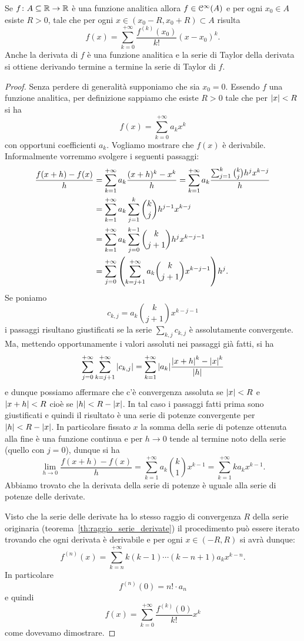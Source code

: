 \begin{theorem}
\label{th:48765}%
Se $f\colon A\subseteq \mathbb R\to\mathbb R$ è una funzione analitica allora
$f\in \mathcal C^\infty(A)$ e per ogni $x_0\in A$ esiste $R>0$, tale che
per ogni $x \in (x_0-R, x_0+R)\subset A$ risulta
\begin{equation}\label{eq:2344494}
  f(x) = \sum_{k=0}^{+\infty} \frac{f^{(k)}(x_0)}{k!}(x-x_0)^k.
\end{equation}
Anche la derivata di $f$ è una funzione analitica e la serie
di Taylor della derivata si ottiene derivando termine a termine
la serie di Taylor di $f$.
\end{theorem}
%
\begin{proof}
Senza perdere di generalità supponiamo che sia $x_0=0$. Essendo $f$
una funzione analitica, per definizione sappiamo che esiste $R>0$
tale che per ${\left|x\right|}<R$ si ha
\[
f(x) = \sum_{k=0}^{+\infty} a_k x^k
\]
con opportuni coefficienti $a_k$. Vogliamo mostrare che $f(x)$ è derivabile.
Informalmente vorremmo svolgere i seguenti passaggi:
\begin{align*}
\frac{f(x+h) - f(x)}{h}
&= \sum_{k=1}^{+\infty} a_k \frac{(x+h)^k-x^k}{h}
= \sum_{k=1}^{+\infty} a_k \frac{\sum_{j=1}^k {k\choose j} h^j x^{k-j}}{h} \\
&= \sum_{k=1}^{+\infty} a_k \sum_{j=1}^k {k\choose j} h^{j-1} x^{k-j} \\
&= \sum_{k=1}^{+\infty} a_k \sum_{j=0}^{k-1} {k\choose j+1} h^j x^{k-j-1} \\
&= \sum_{j=0}^{+\infty} {\left( \sum_{k=j+1}^{+\infty} a_k {k\choose j+1} x^{k-j-1} \right)} h^j.
\end{align*}
Se poniamo
\[
  c_{k,j} = a_k {k\choose j+1} x^{k-j-1}
\]
i passaggi risultano giustificati se la serie $\sum_{k,j} c_{k,j}$
è assolutamente convergente. Ma, mettendo opportunamente
i valori assoluti nei passaggi già fatti, si ha
\[
  \sum_{j=0}^{+\infty} \sum_{k=j+1}^{+\infty} {\left|c_{k,j}\right|}
  =  \sum_{k=1}^{+\infty} {\left|a_k\right|} \frac{{\left|x+h\right|}^k-{\left|x\right|}^k}{{\left|h\right|}}
\]
e dunque possiamo affermare che c'è convergenza assoluta
se ${\left|x\right|}<R$ e ${\left|x+h\right|}<R$ cioè se ${\left|h\right|}< R-{\left|x\right|}$. In tal caso
i passaggi fatti prima sono giustificati e quindi il risultato
è una serie di potenze convergente per ${\left|h\right|}<R-{\left|x\right|}$. In particolare
fissato $x$
la somma della serie di potenze ottenuta alla fine è una funzione continua
e per $h\to 0$
tende al termine noto della serie (quello con $j=0$), dunque si ha
\[
  \lim_{h\to 0} \frac{f(x+h)-f(x)}{h}
  = \sum_{k=1}^{+\infty} a_k {k \choose 1} x^{k-1}
  = \sum_{k=1}^{+\infty} k a_k x^{k-1}.
\]
Abbiamo trovato che la derivata della serie di potenze è uguale
alla serie di potenze delle derivate.

Visto che la serie delle derivate ha lo stesso raggio di convergenza $R$
della serie originaria (teorema~\ref{th:raggio_serie_derivate})
il procedimento può essere iterato trovando che ogni derivata è derivabile
e per ogni $x\in (-R,R)$ si avrà dunque:
\[
  f^{(n)}(x) = \sum_{k=n}^{+\infty}k (k-1) \cdots (k-n+1) a_k x^{k-n}.
\]
In particolare
\[
  f^{(n)}(0) = n! \cdot a_n
\]
e quindi
\[
  f(x) = \sum_{k=0}^{+\infty} \frac{f^{(k)}(0)}{k!} x^k
\]
come dovevamo dimostrare.
\end{proof}

